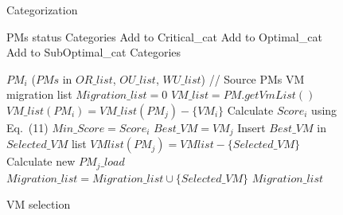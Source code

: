 \documentclass[UTF8, fontset=windows]{article}
\begin{document}
\begin{figure}[b]
  \centering
  \begin{minipage}[t]{0.45\textwidth}
      \begin{algorithm}[H]
          \caption{Categorization}
          \begin{algorithmic}[1]
          \REQUIRE PMs status
          \ENSURE Categories
                  \STATE Add to Critical\_cat
                  \STATE Add to Optimal\_cat
                  \STATE Add to SubOptimal\_cat
              \ENDIF
          \ENDFOR
          \RETURN Categories
          \end{algorithmic}
          \label{alg:categorization}
      \end{algorithm}
  \end{minipage}
  \hfill
  \begin{minipage}[t]{0.45\textwidth}
      \begin{algorithm}[H]
          \caption{VM selection}
          \begin{algorithmic}[1]
          \REQUIRE $PM_i$ ($PMs$ in $OR\_list$, $OU\_list$, $WU\_list$) // Source PMs
          \ENSURE VM migration list
          \STATE $Migration\_list = 0$
              \STATE $VM\_list = PM.getVmList()$
                          \STATE $VM\_list(PM_i) = VM\_list(PM_j) - \{VM_i\}$
                      \ENDIF
                  \ENDFOR
              \ENDIF
                      \STATE Calculate $Score_i$ using Eq.~(11)
                          \STATE $Min\_Score = Score_i$
                          \STATE $Best\_VM = VM_j$
                      \ENDIF
                  \ENDFOR
                  \STATE Insert $Best\_VM$ in $Selected\_VM$ list
                  \STATE $VMlist(PM_j) = VMlist - \{Selected\_VM\}$
                  \STATE Calculate new $PM_j\_load$
              \ENDWHILE
              \STATE $Migration\_list = Migration\_list \cup \{Selected\_VM\}$
          \ENDFOR
          \RETURN $Migration\_list$
          \end{algorithmic}
          \label{alg:vm_selection}
      \end{algorithm}
  \end{minipage}
\end{figure}
\end{document}
